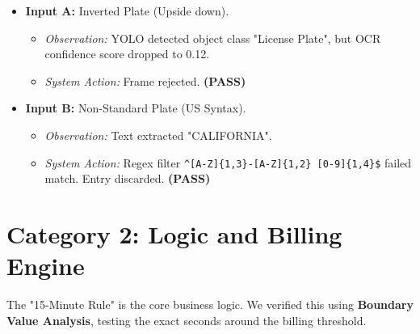 \begin{itemize}
	\item \textbf{Input A:} Inverted Plate (Upside down).
	\begin{itemize}
		\item \textit{Observation:} YOLO detected object class "License Plate", but OCR confidence score dropped to 0.12.
		\item \textit{System Action:} Frame rejected. \textbf{(PASS)}
	\end{itemize}
	\item \textbf{Input B:} Non-Standard Plate (US Syntax).
	\begin{itemize}
		\item \textit{Observation:} Text extracted "CALIFORNIA".
		\item \textit{System Action:} Regex filter \texttt{\textasciicircum[A-Z]\{1,3\}-[A-Z]\{1,2\} [0-9]\{1,4\}\$} failed match. Entry discarded. \textbf{(PASS)}
	\end{itemize}
\end{itemize}

\section{Category 2: Logic and Billing Engine}
The "15-Minute Rule" is the core business logic. We verified this using \textbf{Boundary Value Analysis}, testing the exact seconds around the billing threshold.



